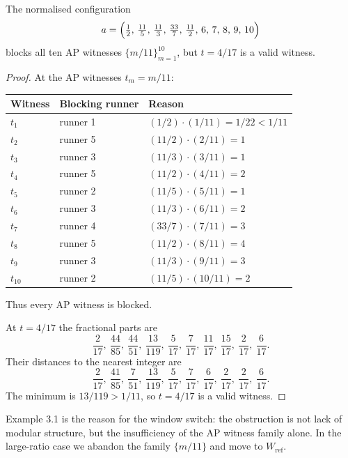 \documentclass[12pt]{article}
\begin{document}
\begin{example}\label{e:31}
The normalised configuration
\[
a = \Bigl(\tfrac{1}{2},\,\tfrac{11}{5},\,\tfrac{11}{3},\,\tfrac{33}{7},\,\tfrac{11}{2},
             \,6,\,7,\,8,\,9,\,10\Bigr)
\]
blocks all ten AP witnesses $\{m/11\}_{m=1}^{10}$, but $t=4/17$ is a valid witness.

\end{example}
\begin{proof}
At the AP witnesses $t_m=m/11$:

\begin{center}
\begin{tabular}{@{}lll@{}}
\toprule
Witness & Blocking runner & Reason \\
\midrule
$t_1$ & runner 1 & $(1/2)\cdot(1/11)=1/22<1/11$ \\
$t_2$ & runner 5 & $(11/2)\cdot(2/11)=1$ \\
$t_3$ & runner 3 & $(11/3)\cdot(3/11)=1$ \\
$t_4$ & runner 5 & $(11/2)\cdot(4/11)=2$ \\
$t_5$ & runner 2 & $(11/5)\cdot(5/11)=1$ \\
$t_6$ & runner 3 & $(11/3)\cdot(6/11)=2$ \\
$t_7$ & runner 4 & $(33/7)\cdot(7/11)=3$ \\
$t_8$ & runner 5 & $(11/2)\cdot(8/11)=4$ \\
$t_9$ & runner 3 & $(11/3)\cdot(9/11)=3$ \\
$t_{10}$ & runner 2 & $(11/5)\cdot(10/11)=2$ \\
\bottomrule
\end{tabular}
\end{center}

Thus every AP witness is blocked.

At $t=4/17$ the fractional parts are
\[
\frac{2}{17},\ \frac{44}{85},\ \frac{44}{51},\ \frac{13}{119},\ \frac{5}{17},\
\frac{7}{17},\ \frac{11}{17},\ \frac{15}{17},\ \frac{2}{17},\ \frac{6}{17}.
\]
Their distances to the nearest integer are
\[
\frac{2}{17},\ \frac{41}{85},\ \frac{7}{51},\ \frac{13}{119},\ \frac{5}{17},\
\frac{7}{17},\ \frac{6}{17},\ \frac{2}{17},\ \frac{2}{17},\ \frac{6}{17}.
\]
The minimum is $13/119>1/11$, so $t=4/17$ is a valid witness.
\end{proof}

Example 3.1 is the reason for the window switch: the obstruction is not lack of modular
structure, but the insufficiency of the AP witness family alone. In the large-ratio case
we abandon the family $\{m/11\}$ and move to $W_{\mathrm{ref}}$.
\end{document}
